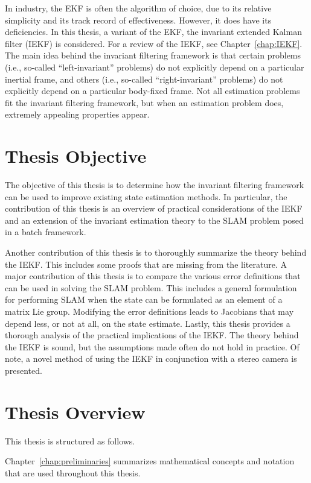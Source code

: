 In industry, the EKF is often the algorithm of choice, due to its relative simplicity and its track record of effectiveness. However, it does have its deficiencies. In this thesis, a variant of the EKF, the invariant extended Kalman filter (IEKF) is considered. For a review of the IEKF, see Chapter~\ref{chap:IEKF}. The main idea behind the invariant filtering framework is that certain problems (i.e., so-called ``left-invariant'' problems) do not explicitly depend on a particular inertial frame, and others (i.e., so-called ``right-invariant'' problems) do not explicitly depend on a particular body-fixed frame. Not all estimation problems fit the invariant filtering framework, but when an estimation problem does, extremely appealing properties appear. 

\section{Thesis Objective}

The objective of this thesis is to determine how the invariant filtering framework can be used to improve existing state estimation methods. In particular, the contribution of this thesis is an overview of practical considerations of the IEKF and an extension of the invariant estimation theory to the SLAM problem posed in a batch framework.

Another contribution of this thesis is to thoroughly summarize the theory behind the IEKF. This includes some proofs that are missing from the literature. A major contribution of this thesis is to compare the various error definitions that can be used in solving the SLAM problem. This includes a general formulation for performing SLAM when the state can be formulated as an element of a matrix Lie group. Modifying the error definitions leads to Jacobians that may depend less, or not at all, on the state estimate. 
Lastly, this thesis provides a thorough analysis of the practical implications of the IEKF. The theory behind the IEKF is sound, but the assumptions made often do not hold in practice. Of note, a novel method of using the IEKF in conjunction with a stereo camera is presented.

\section{Thesis Overview}

This thesis is structured as follows.

Chapter~\ref{chap:preliminaries} summarizes mathematical concepts and notation that are used throughout this thesis. 


